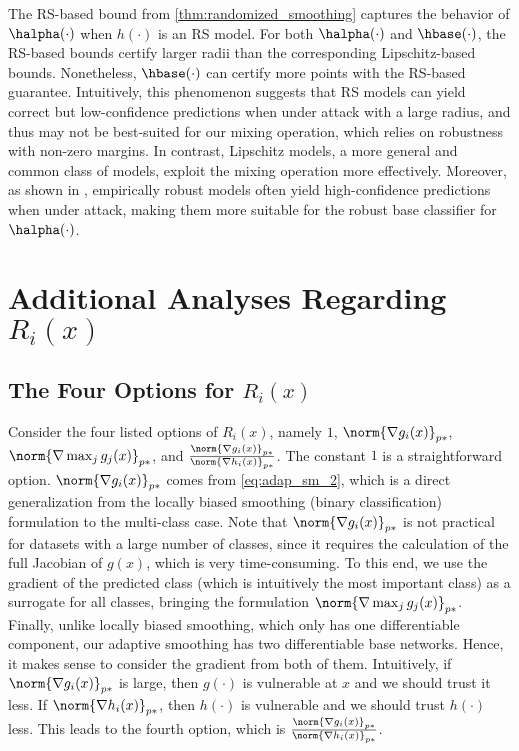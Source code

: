 \documentclass[11pt, letterpaper]{article}
\theoremstyle{plain}
\theoremstyle{definition}
\begin{document}
The RS-based bound from \cref{thm:randomized_smoothing} captures the behavior of $\halpha (\cdot)$ when $h (\cdot)$ is an RS model. For both $\halpha (\cdot)$ and $\hbase (\cdot)$, the RS-based bounds certify larger radii than the corresponding Lipschitz-based bounds. Nonetheless, $\hbase(\cdot)$ can certify more points with the RS-based guarantee. Intuitively, this phenomenon suggests that RS models can yield correct but low-confidence predictions when under attack with a large radius, and thus may not be best-suited for our mixing operation, which relies on robustness with non-zero margins. In contrast, Lipschitz models, a more general and common class of models, exploit the mixing operation more effectively. Moreover, as shown in , empirically robust models often yield high-confidence predictions when under attack, making them more suitable for the robust base classifier for $\halpha (\cdot)$.



\section{Additional Analyses Regarding $R_i (x)$} \label{sec:more_R_analyses}

\subsection{The Four Options for $R_i (x)$} \label{sec:R_options}

Consider the four listed options of $R_i (x)$, namely $1$, $\norm{\nabla g_i (x)}_{p*}$, $\norm{\nabla \max_j g_j (x)}_{p*}$, and $\frac{\norm{\nabla g_i (x)}_{p*}} {\norm{\nabla h_i (x)}_{p*}}$. The constant $1$ is a straightforward option. $\norm{\nabla g_i (x)}_{p*}$ comes from \cref{eq:adap_sm_2}, which is a direct generalization from the locally biased smoothing (binary classification) formulation to the multi-class case. Note that $\norm{\nabla g_i (x)}_{p*}$ is not practical for datasets with a large number of classes, since it requires the calculation of the full Jacobian of $g (x)$, which is very time-consuming. To this end, we use the gradient of the predicted class (which is intuitively the most important class) as a surrogate for all classes, bringing the formulation $\norm{\nabla \max_j g_j (x)}_{p*}$. Finally, unlike locally biased smoothing, which only has one differentiable component, our adaptive smoothing has two differentiable base networks. Hence, it makes sense to consider the gradient from both of them. Intuitively, if $\norm{\nabla g_i (x)}_{p*}$ is large, then $g (\cdot)$ is vulnerable at $x$ and we should trust it less. If $\norm{\nabla h_i (x)}_{p*}$, then $h (\cdot)$ is vulnerable and we should trust $h (\cdot)$ less. This leads to the fourth option, which is $\frac{\norm{\nabla g_i (x)}_{p*}} {\norm{\nabla h_i (x)}_{p*}}$.
\end{document}
